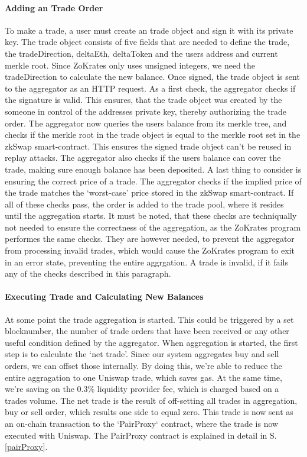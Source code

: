 \documentclass[../../thesis.tex]{subfiles}
\begin{document}
\paragraph{Adding an Trade Order}
To make a trade, a user must create an trade object and sign it with its private key. The trade object consists of five fields that are needed to define the trade, the tradeDirection, deltaEth, deltaToken and the users address and current merkle root. Since ZoKrates only uses unsigned integers, we need the tradeDirection to calculate the new balance. Once signed, the trade object is sent to the aggregator as an HTTP request. As a first check, the aggregator checks if the signature is valid. This ensures, that the trade object was created by the someone in control of the addresses private key, thereby authorizing the trade order. The aggregator now queries the users balance from its merkle tree, and checks if the merkle root in the trade object is equal to the merkle root set in the zkSwap smart-contract. This ensures the signed trade object can't be reused in replay attacks. The aggregator also checks if the users balance can cover the trade, making sure enough balance has been deposited. A last thing to consider is ensuring the correct price of a trade. The aggregator checks if the implied price of the trade matches the ‘worst-case’ price stored in the zkSwap smart-contract. If all of these checks pass, the order is added to the trade pool, where it resides until the aggregation starts. It must be noted, that these checks are techniqually not needed to ensure the correctness of the aggregation, as the ZoKrates program performes the same checks. They are however needed, to prevent the aggregator from processing invalid trades, which would cause the ZoKrates program to exit in an error state, preventing the entire aggrgation. A trade is invalid, if it fails any of the checks described in this paragraph.

\paragraph{Executing Trade and Calculating New Balances}
At some point the trade aggregation is started. This could be triggered by a set blocknumber, the number of trade orders that have been received or any other useful condition defined by the aggregator. When aggregation is started, the first step is to calculate the `net trade'. Since our system aggregates buy and sell orders, we can offset those internally. By doing this, we're able to reduce the entire aggragation to one Uniswap trade, which saves gas. At the same time, we're saving on the 0.3\% liquidity provider fee, which is charged based on a trades volume. The net trade is the result of off-setting all trades in aggregation, buy or sell order, which results one side to equal zero. This trade is now sent as an on-chain transaction to the `PairProxy` contract, where the trade is now executed with Uniswap. The PairProxy contract is explained in detail in S. \ref{pairProxy}. 
\end{document}
